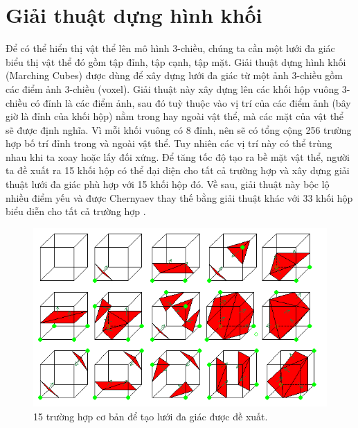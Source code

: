 \section{Giải thuật dựng hình khối}
Để có thể hiển thị vật thể lên mô hình 3-chiều, chúng ta cần một lưới đa giác biểu thị vật thể đó gồm tập đỉnh, tập cạnh, tập mặt. Giải thuật dựng hình khối (Marching Cubes) được dùng để xây dựng lưới đa giác từ một ảnh 3-chiều gồm các điểm ảnh 3-chiều (voxel). Giải thuật này xây dựng lên các khối hộp vuông 3-chiều có đỉnh là các điểm ảnh, sau đó tuỳ thuộc vào vị trí của các điểm ảnh (bây giờ là đỉnh của khối hộp) nằm trong hay ngoài vật thể, mà các mặt của vật thể sẽ được định nghĩa. Vì mỗi khối vuông có 8 đỉnh, nên sẽ có tổng cộng 256 trường hợp bố trí đỉnh trong và ngoài vật thể. Tuy nhiên các vị trí này có thể trùng nhau khi ta xoay hoặc lấy đối xứng. Để tăng tốc độ tạo ra bề mặt vật thể, người ta đề xuất ra 15 khối hộp có thể đại diện cho tất cả trường hợp và xây dựng giải thuật lưới đa giác phù hợp với 15 khối hộp đó. Về sau, giải thuật này bộc lộ nhiều điểm yếu và được Chernyaev thay thế bằng giải thuật khác với 33 khối hộp biểu diễn cho tất cả trường hợp \cite{marching_cube}.

\begin{figure}[h]
\centering
    \includegraphics[totalheight=4cm]{Images/marching_15.png}
    \caption{15 trường hợp cơ bản để tạo lưới đa giác được đề xuất.}
    \label{marching_15}
\end{figure}
